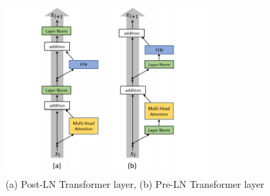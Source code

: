 \begin{figure}
	\centering
	\includegraphics[width=0.7\textwidth]{figures/ml_theory/post_pre_trsf.png}
	\caption{(a) Post-LN Transformer layer, (b) Pre-LN Transformer
		layer~\cite{xiong_layer_2020}}
	\label{fig:post_pre_trsf}
\end{figure}


